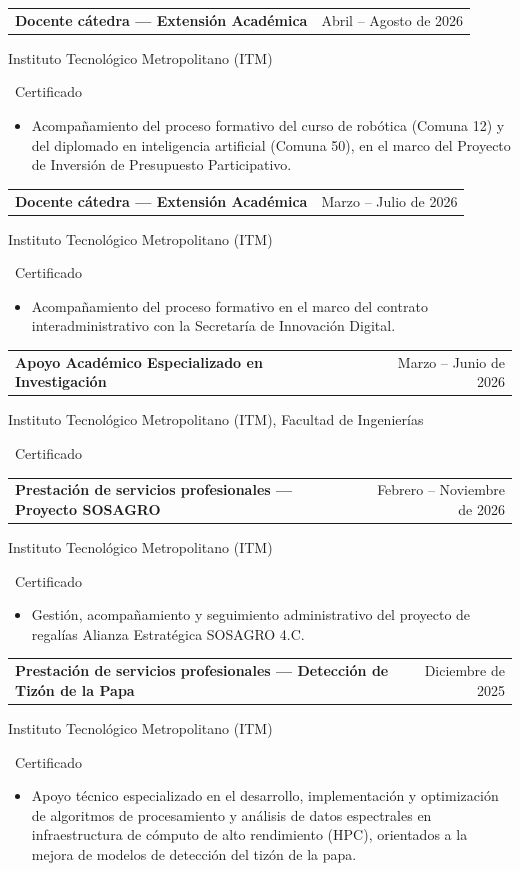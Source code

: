 \documentclass[10pt, letterpaper]{article}
\makeatletter
\newcommand{\ItemCV}[2]{%
  \par\noindent\begin{tabularx}{\linewidth}{@{}X r@{}}
    {\FuenteTitulo\normalsize\color{GrisPizarra}\bfseries #1} &
    {\FuenteCodigo\small\color{GrisMedio}#2}\\
  \end{tabularx}\par\vspace{0.1em}%
}
\newcommand{\Certificado}{%
  \colorbox{VerdeTarea!15}{\color{VerdeTarea}\small\bfseries\strut\ Certificado\ }}
\makeatother
\begin{document}
\ItemCV{Docente cátedra — Extensión Académica}{Abril -- Agosto de 2026}
Instituto Tecnológico Metropolitano (ITM)\quad\Certificado
\begin{itemize}
  \item{} Acompañamiento del proceso formativo del curso de robótica
        (Comuna 12) y del diplomado en inteligencia artificial (Comuna 50),
        en el marco del Proyecto de Inversión de Presupuesto Participativo.
\end{itemize}

\vspace{0.5em}

\ItemCV{Docente cátedra — Extensión Académica}{Marzo -- Julio de 2026}
Instituto Tecnológico Metropolitano (ITM)\quad\Certificado
\begin{itemize}
  \item{} Acompañamiento del proceso formativo en el marco del contrato
        interadministrativo con la Secretaría de Innovación Digital.
\end{itemize}

\vspace{0.5em}

\ItemCV{Apoyo Académico Especializado en Investigación}{Marzo -- Junio de 2026}
Instituto Tecnológico Metropolitano (ITM), Facultad de Ingenierías\quad\Certificado

\vspace{0.5em}

\ItemCV{Prestación de servicios profesionales --- Proyecto SOSAGRO}{Febrero -- Noviembre de 2026}
Instituto Tecnológico Metropolitano (ITM)\quad\Certificado
\begin{itemize}
  \item{} Gestión, acompañamiento y seguimiento administrativo del proyecto
        de regalías Alianza Estratégica SOSAGRO 4.C.
\end{itemize}

\vspace{0.5em}

\ItemCV{Prestación de servicios profesionales --- Detección de Tizón de la Papa}{Diciembre de 2025}
Instituto Tecnológico Metropolitano (ITM)\quad\Certificado
\begin{itemize}
  \item{} Apoyo técnico especializado en el desarrollo, implementación y
        optimización de algoritmos de procesamiento y análisis de datos
        espectrales en infraestructura de cómputo de alto rendimiento (HPC),
        orientados a la mejora de modelos de detección del tizón de la papa.
\end{itemize}
\end{document}
